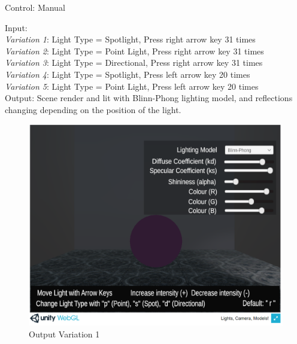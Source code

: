 \documentclass[12pt, titlepage]{article}
\begin{document}
\begin{enumerate}
	Control: Manual
	
	Input:  \\
	\textit{Variation 1}: Light Type = Spotlight, Press right arrow key 31 
	times\\
	\textit{Variation 2}: Light Type = Point Light, Press right arrow key 31 
	times\\
	\textit{Variation 3}: Light Type = Directional, Press right arrow key 31 
	times\\
	\textit{Variation 4}: Light Type = Spotlight, Press left arrow key 20 
	times\\
	\textit{Variation 5}: Light Type = Point Light, Press left arrow key 20 
		times\\
		
	Output: Scene render and lit with Blinn-Phong lighting model, and 
	reflections changing depending on the position of the light.
	
	\begin{figure}[h]
		\centering
		\includegraphics[scale=0.25]{./images/sphere-lit-spotlight-moveBoundsR}
		\caption{Output Variation 1}
		\label{fig:spotlight-bounds-right}
	\end{figure}	


\end{enumerate}
\end{document}
